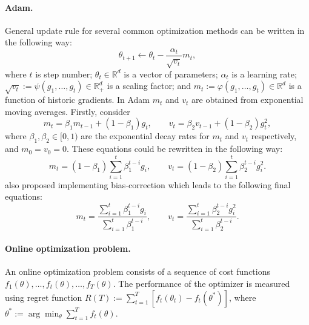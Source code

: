 \documentclass{article} %
\begin{document}
\paragraph{Adam.} General update rule for several common optimization
methods can be written in the following way:
\begin{equation}
    \theta_{t+1} \leftarrow \theta_t - \frac{\alpha_t}{
    \sqrt{v_t}}m_t,
\end{equation}
where $t$ is step number; $\theta_t \in \mathbb{R}^d$ is a vector of parameters; $\alpha_t$ is a learning rate;
$\sqrt{v_t} := \psi(g_1,\dots, g_t) \in\mathbb{R}_+^d$
is a scaling factor; and $m_t := \varphi(g_1,\dots, g_t)
\in\mathbb{R}^d$ is a function of historic gradients.
In Adam $m_t$ and $v_t$ are obtained from exponential moving averages. Firstly, consider
\begin{equation}
    m_t = \beta_1 m_{t - 1} + (1 - \beta_1) g_t,
    \qquad v_t = \beta_2 v_{t - 1} + (1 - \beta_2) g_t^2,
\end{equation}
where $\beta_1, \beta_2 \in [0, 1)$ are the exponential
decay rates for $m_t$ and $v_t$ respectively, and
$m_0 = v_0 = 0$.  These equations could be rewritten in the following way:
\begin{equation}
    m_t = (1 - \beta_1) \sum_{i = 1}^t \beta_1^{t - i} g_i,
    \qquad v_t = (1 - \beta_2) \sum_{i = 1}^t \beta_2^{t - i}
    g_i^2.
\end{equation}
\cite{kingma2014adam} also proposed implementing bias-correction
which leads to the following final equations:
\begin{equation}
    m_t = \frac{
    \sum_{i = 1}^t \beta_1^{t - i}g_i}{\sum_{i = 1}^t
    \beta_1^{t - i}},
    \qquad v_t = \frac{\sum_{i=1}^t \beta_2^{t - i}g_i^2}{
    \sum_{i=1}^t \beta_2^{t - i}}.
\end{equation}

\paragraph{Online optimization problem. } An online optimization
problem consists of a sequence of cost functions
$f_1(\theta), \dots, f_t(\theta), \dots, f_T(\theta)$. The performance of the optimizer is measured
using regret function $R(T) := \sum_{t=1}^T [f_t(\theta_t) -
f_t(\theta^*)]$, where $\theta^* := \arg\min_\theta
\sum_{t=1}^T f_t(\theta)$.
\end{document}

